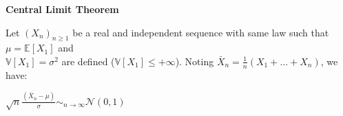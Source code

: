 {\fontsize{12pt}{22pt} \textbf{Central Limit Theorem}\par}

\vspace{5mm}

Let $(X_n)_{n \ge 1}$ be a real and independent sequence with same law such that $\mu = \mathbb{E}[X_1]$ and \\
$\mathbb{V}[X_1]=\sigma^2$ are defined ($\mathbb{V}[X_1] \leq +\infty$). Noting $\bar{X}_n=\frac{1}{n}(X_1 + ... + X_n)$, we have:
\begin{center}
$\sqrt{n}\frac{(\bar{X}_n-\mu)}{\sigma} \sim_{n \to \infty} \mathcal{N}(0,1)$
\end{center}

\vspace{5mm}